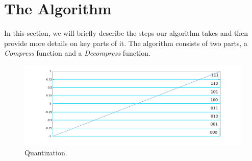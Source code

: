 \section{The Algorithm}
\label{sec:algorithm}

In this section, we will briefly describe the steps our algorithm takes and then provide more details on key parts of it. The algorithm consists of two parts, a \emph{Compress} function and a \emph{Decompress} function. 

\begin{figure}[tbh]
  \centering
  \includegraphics[width=\columnwidth]{images/bqQuantizer}
  \caption{Quantization.}
  \label{fig:bpQuantizer}
\end{figure}

